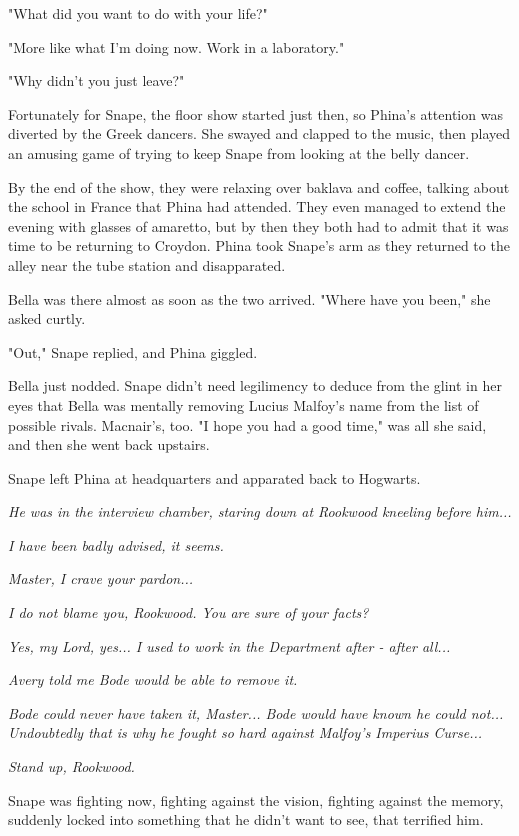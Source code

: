 "What did you want to do with your life?"

"More like what I'm doing now. Work in a laboratory."

"Why didn't you just leave?"

Fortunately for Snape, the floor show started just then, so Phina's attention was diverted by the Greek dancers. She swayed and clapped to the music, then played an amusing game of trying to keep Snape from looking at the belly dancer.

By the end of the show, they were relaxing over baklava and coffee, talking about the school in France that Phina had attended. They even managed to extend the evening with glasses of amaretto, but by then they both had to admit that it was time to be returning to Croydon. Phina took Snape's arm as they returned to the alley near the tube station and disapparated.

Bella was there almost as soon as the two arrived. "Where have you been," she asked curtly.

"Out," Snape replied, and Phina giggled.

Bella just nodded. Snape didn't need legilimency to deduce from the glint in her eyes that Bella was mentally removing Lucius Malfoy's name from the list of possible rivals. Macnair's, too. "I hope you had a good time," was all she said, and then she went back upstairs.

Snape left Phina at headquarters and apparated back to Hogwarts.

\sbreak

\emph{He was in the interview chamber, staring down at Rookwood kneeling before him...}

\emph{I have been badly advised, it seems.}

\emph{Master, I crave your pardon...}

\emph{I do not blame you, Rookwood. You are sure of your facts?}

\emph{Yes, my Lord, yes... I used to work in the Department after - after all...}

\emph{Avery told me Bode would be able to remove it.}

\emph{Bode could never have taken it, Master... Bode would have known he could not... Undoubtedly that is why he fought so hard against Malfoy's Imperius Curse...}

\emph{Stand up, Rookwood.}

Snape was fighting now, fighting against the vision, fighting against the memory, suddenly locked into something that he didn't want to see, that terrified him.


